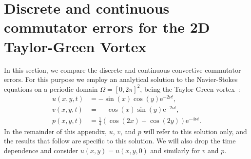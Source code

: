 \documentclass[preprint]{elsarticle}
\newcommand{\revboth}[1]{#1}
\begin{document}

\section{Discrete and continuous commutator errors for the 2D Taylor-Green Vortex}
\label{sec:commutator}

In this section, we compare the discrete and continuous convective commutator
errors. For this purpose we employ an analytical solution to the Navier-Stokes
equations on a periodic domain $\Omega = [0, 2 \pi]^2$, being the Taylor-Green
vortex~\cite{Green1937}:
\begin{equation} \label{eq:taylorgreen}
    \begin{split}
        u(x, y, t) & = - \sin(x) \cos(y) \mathrm{e}^{-2 \nu t}, \\
        v(x, y, t) & = \phantom{+} \cos(x) \sin(y) \mathrm{e}^{-2 \nu t}, \\
        p(x, y, t) & = \frac{1}{4} \left( \cos(2 x) + \cos(2 y) \right)
        \mathrm{e}^{-4 \nu t}.
    \end{split}
\end{equation}
In the remainder of this appendix, $u$, $v$, and $p$ will refer to this solution
only, and the results that follow are specific to this solution.
We will also drop the time dependence and consider $u(x, y) = u(x, y, 0)$ and similarly for $v$ and $p$.
\end{document}
